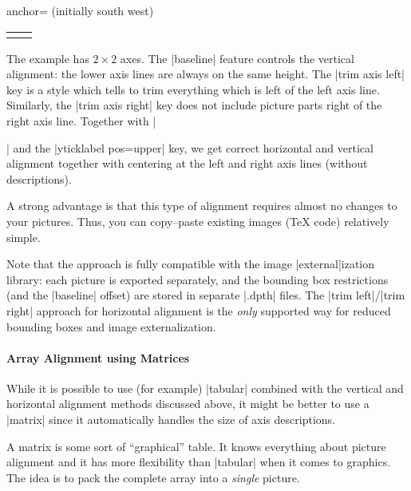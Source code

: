 \begin{pgfplotskey}{anchor= (initially south west)}
\begin{minipage}
\begin{tabular}
\begin{codeexample}[]
\begin{center}
\begin{tabular}{rl}
\begin{tikzpicture}[baseline,trim axis right]
\begin{axis}[yticklabel pos=upper]
            \addplot {x^4};
        \end{axis}
    \end{tikzpicture}
        \\
\end{tabular}
\end{center}
\end{codeexample}
    \noindent The example has $2 \times 2$ axes. The |baseline| feature
    controls the vertical alignment: the lower axis lines are always on the
    same height. The |trim axis left| key is a style which tells \Tikz{} to
    trim everything which is left of the left axis line. Similarly, the
    |trim axis right| key does not include picture parts right of the right
    axis line. Together with |\begin{center}| and the |yticklabel pos=upper|
    key, we get correct horizontal and vertical alignment together with
    centering at the left and right axis lines (without descriptions).

    A strong advantage is that this type of alignment requires almost no
    changes to your pictures. Thus, you can copy--paste existing images (\TeX{}
    code) relatively simple.

    Note that the approach is fully compatible with the image |external|ization
    library: each picture is exported separately, and the bounding box
    restrictions (and the |baseline| offset) are stored in separate |.dpth|
    files. The |trim left|/|trim right| approach for horizontal alignment is
    the \emph{only} supported way for reduced bounding boxes and image
    externalization.


    \paragraph{Array Alignment using \Tikz{} Matrices}

    While it is possible to use (for example) |tabular| combined with the
    vertical and horizontal alignment methods discussed above, it might be
    better to use a \Tikz{} |matrix| since it automatically handles the size of
    axis descriptions.

    A \Tikz{} matrix is some sort of ``graphical'' table. It knows everything
    about picture alignment and it has more flexibility than |tabular| when it
    comes to graphics. The idea is to pack the complete array into a
    \emph{single} picture.


\end{center}
\end{tabular}
\end{minipage}
\end{pgfplotskey}
